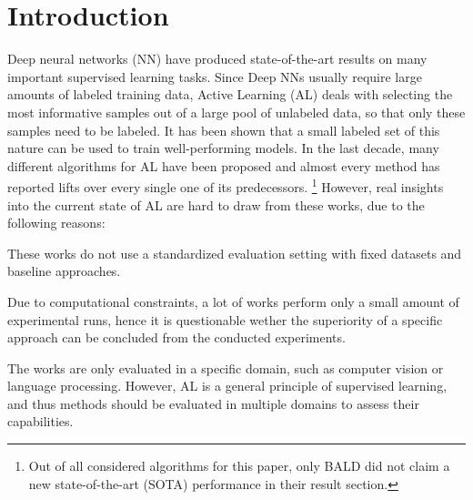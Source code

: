 \documentclass[]{article}
\begin{document}
\section{Introduction}\label{sec:introduction}
Deep neural networks (NN) have produced state-of-the-art results on many
important supervised learning tasks. Since Deep NNs usually require large
amounts of labeled training data, Active Learning (AL) deals with
selecting the most informative samples out of a large pool of unlabeled data, so
that only these samples need to be labeled. It has been shown that a small
labeled set of this nature can be used to train well-performing models.
In the last decade, many different algorithms for AL have been proposed and
almost every method has reported lifts over every single one of its predecessors. \footnote{Out
of all considered algorithms for this paper, only BALD \cite{gal2017deep} did
not claim a new state-of-the-art (SOTA) performance in their result section.} However, real
insights into the current state of AL are hard to draw from these works, due to
the following reasons:
\begin{inparaenum}
\item\label{prob1al} These works do not use a standardized evaluation setting with fixed
datasets and baseline approaches.
\item Due to computational constraints, a lot of works perform only a small amount of experimental
runs, hence it is questionable wether the superiority of a specific approach can
be concluded from the conducted experiments.
\item The works are only evaluated in a specific domain, such as computer vision
or language processing. However, AL is a general principle of supervised
learning, and thus methods should be evaluated in multiple domains to assess
their capabilities.
\end{inparaenum}
\end{document}
